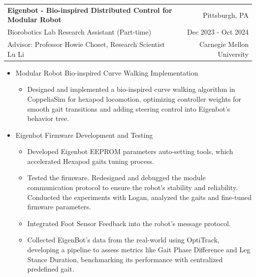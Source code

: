 \documentclass[a4paper,20pt]{article}
\makeatletter
\newcommand{\resumeResearchSubheading}[6]{
  \vspace{4pt}\item
    \begin{tabular*} {0.98\textwidth} {@{\hspace{-0.5em}}l@{\extracolsep{\fill}}r@{}}
      \textbf{#1} & {#2}\null \\
      {#3} & {#4} \\
      {#5} & {#6}
    \end{tabular*}
  \vspace{0pt}
}
\newcommand{\resumeResearchItemListStart}{
  \begin{itemize} [leftmargin=*]
}
\newcommand{\resumeResearchItemListEnd}{
  \end{itemize}
  \vspace{-5pt}
}
\newcommand{\resumeResearchItem}[1]{
  \item{
    {#1 \vspace{-1pt}}
  }
}
\newcommand{\resumeResearchMidItemListStart}{
  \begin{itemize} [leftmargin=*]
}
\newcommand{\resumeResearchMidItemListEnd}{
  \end{itemize}
  \vspace{-8pt}
}
\newcommand{\resumeResearchMidItem}[2]{
  \item{
    \textbf{#1}
    {#2 \vspace{-2pt}}
  }
}
\makeatother
\begin{document}
\resumeResearchSubheading
{Eigenbot - Bio-inspired Distributed Control for Modular Robot} {Pittsburgh, PA}
{Biorobotics Lab Research Assistant (Part-time)} {Dec 2023 - Oct 2024}
{Advisor: Professor Howie Choset, Research Scientist Lu Li} {Carnegie Mellon University}
\resumeResearchMidItemListStart
\resumeResearchMidItem{}
{Modular Robot Bio-inspired Curve Walking Implementation}
{
  \resumeResearchItemListStart
    \resumeResearchItem{}
  {  Designed and implemented a bio-inspired curve walking algorithm in
  CoppeliaSim for hexapod locomotion,
  optimizing controller weights for smooth gait transitions and
  adding steering control into Eigenbot's behavior tree.}

  \resumeResearchItemListEnd
}
\resumeResearchMidItem{}
{Eigenbot Firmware Development and Testing}
{
  \resumeResearchItemListStart
  \resumeResearchItem{}
  {Developed Eigenbot EEPROM parameters auto-setting tools, which accelerated Hexapod gaits tuning process.}
  \resumeResearchItem{}
  {Tested the firmware. Redesigned and debugged the module communication protocol to ensure the robot's stability and reliability. Conducted the experiments with Logan, analyzed the gaits and fine-tuned firmware parameters.}
  \resumeResearchItem{}
  {Integrated Foot Sensor Feedback into the robot's message protocol.}
  \resumeResearchItem{}
  {Collected EigenBot's data from the real-world using OptiTrack, developing a pipeline to assess metrics like Gait Phase Difference and Leg Stance Duration, benchmarking its performance with centralized predefined gait.}
  \resumeResearchItemListEnd
}
\resumeResearchMidItemListEnd

\end{document}
